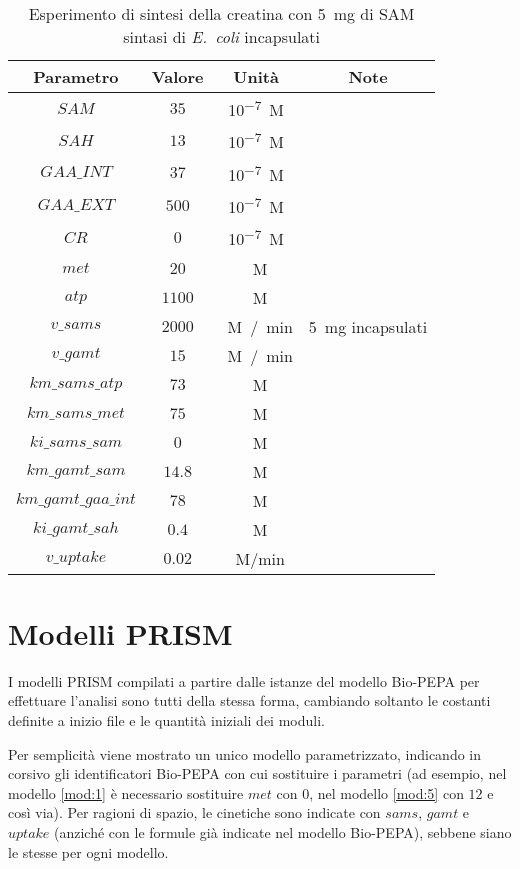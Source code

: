 \begin{table}[H]
	\centering
	\begin{tabular}{| c | c | c | c |}
	\hline
	Parametro & Valore & Unit\`a & Note \\
		\hline
		$SAM$ & $35$ & \si{10^{-7} M} & \\
		\hline
		$SAH$ & $13$ & \si{10^{-7} M} & \\
		\hline
		$GAA\_INT$ & $37$ & \si{10^{-7} M} & \\
		\hline
		$GAA\_EXT$ & $500$ & \si{10^{-7} M} & \\
		\hline
		$CR$ & $0$ & \si{10^{-7} M} & \\
		\hline
		$met$ & $20$ & \si{\mu M} & \\
		\hline
		$atp$ & $1100$ & \si{\mu M} & \\
		\hline
		$v\_sams$ & $2000$ & \si{\mu M / min} & \SI{5}{mg} incapsulati \\
		\hline
		$v\_gamt$ & $15$ & \si{\mu M / min} & \\
		\hline
		$km\_sams\_atp$ & $73$ & \si{\mu M} & \\
		\hline
		$km\_sams\_met$ & $75$ & \si{\mu M} & \\
		\hline
		$ki\_sams\_sam$ & $0$ & \si{\mu M} & \\
		\hline
		$km\_gamt\_sam$ & $14.8$ & \si{\mu M} & \\
		\hline
		$km\_gamt\_gaa\_int$ & $78$ & \si{\mu M} & \\
		\hline
		$ki\_gamt\_sah$ & $0.4$ & \si{\mu M} & \\
		\hline
		$v\_uptake$ & $0.02$ & \si{\mu M/min} & \\
		\hline
	\end{tabular}
	\caption{Esperimento di sintesi della creatina con \SI{5}{mg} di SAM sintasi di \emph{E.\ coli} incapsulati}
	\label{mod:14}
\end{table}

\section{Modelli PRISM}\label{sez:modprism}
I modelli PRISM compilati a partire dalle istanze del modello Bio-PEPA per effettuare l'analisi sono tutti della stessa forma, cambiando soltanto le costanti definite a inizio file e le quantit\`a iniziali dei moduli.

Per semplicit\`a viene mostrato un unico modello parametrizzato, indicando in corsivo gli identificatori Bio-PEPA con cui sostituire i parametri (ad esempio, nel modello \ref{mod:1} \`e necessario sostituire $met$ con $0$, nel modello \ref{mod:5} con $12$ e cos\`i via).
Per ragioni di spazio, le cinetiche sono indicate con $sams$, $gamt$ e $uptake$ (anzich\'e con le formule gi\`a indicate nel modello Bio-PEPA), sebbene siano le stesse per ogni modello.

